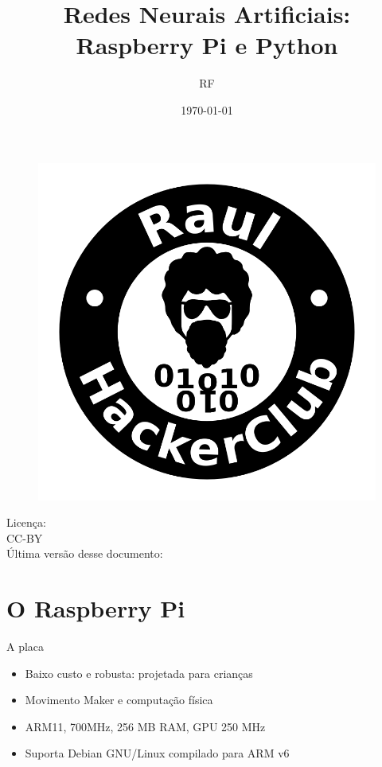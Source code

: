 \documentclass{beamer}
\author{RF}
\title{Redes Neurais Artificiais: Raspberry Pi e Python}
\date{\today}
\begin{document}

  \begin{frame}
    \begin{figure}[htpb]
    \includegraphics[scale=0.8]{salvador-logo.png}
   \end{figure}
  \end{frame}

  \frame{\maketitle}

  \frame{\tableofcontents}


  \begin{frame}
    Licença:\\
    CC-BY\\
    Última versão desse documento:
    
  \end{frame}




  \section{O Raspberry Pi}

    \frame{\sectionpage}
    \begin{frame}{A placa}
      \begin{itemize}
	\item Baixo custo e robusta: projetada para crianças
	\item Movimento Maker e computação física
	\item ARM11, 700MHz, 256 MB RAM, GPU 250 MHz
	\item Suporta Debian GNU/Linux compilado para ARM v6
      \end{itemize}
    \end{frame}
\end{document}

